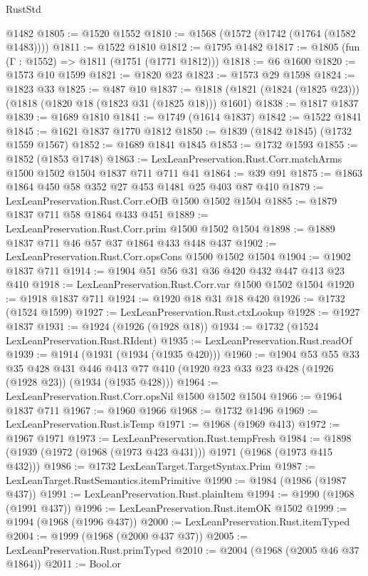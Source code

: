 \begin{lexlean}{RustStd}
\begin{coremodule}
    @1482
@1805 := @1520 @1552
@1810 := @1568 (@1572 (@1742 (@1764 (@1582 @1483))))
@1811 := @1522 @1810
@1812 := @1795 @1482
@1817 := @1805 (fun (Γ : @1552) => @1811 (@1751 (@1771 @1812)))
@1818 := @6 @1600
@1820 := @1573 @10 @1599
@1821 := @1820 @23
@1823 := @1573 @29 @1598
@1824 := @1823 @33
@1825 := @487 @10
@1837 := @1818 (@1821 (@1824 (@1825 @23))) (@1818 (@1820 @18 (@1823 @31 (@1825 @18))) @1601)
@1838 := @1817 @1837
@1839 := @1689 @1810
@1841 := @1749 (@1614 @1837)
@1842 := @1522 @1841
@1845 := @1621 @1837 @1770 @1812
@1850 := @1839 (@1842 @1845) (@1732 @1559 @1567)
@1852 := @1689 @1841 @1845
@1853 := @1732 @1593
@1855 := @1852 (@1853 @1748)
@1863 := LexLeanPreservation.Rust.Corr.matchArms @1500 @1502 @1504 @1837 @711 @711 @41
@1864 := @39 @91
@1875 := @1863 @1864 @450 @58 @352 @27 @453 @1481 @25 @403 @87 @410
@1879 := LexLeanPreservation.Rust.Corr.eOfB @1500 @1502 @1504
@1885 := @1879 @1837 @711 @58 @1864 @433 @451
@1889 := LexLeanPreservation.Rust.Corr.prim @1500 @1502 @1504
@1898 := @1889 @1837 @711 @46 @57 @37 @1864 @433 @448 @437
@1902 := LexLeanPreservation.Rust.Corr.opsCons @1500 @1502 @1504
@1904 := @1902 @1837 @711
@1914 := @1904 @51 @56 @31 @36 @420 @432 @447 @413 @23 @410
@1918 := LexLeanPreservation.Rust.Corr.var @1500 @1502 @1504
@1920 := @1918 @1837 @711
@1924 := @1920 @18 @31 @18 @420
@1926 := @1732 (@1524 @1599)
@1927 := LexLeanPreservation.Rust.ctxLookup
@1928 := @1927 @1837
@1931 := @1924 (@1926 (@1928 @18))
@1934 := @1732 (@1524 LexLeanPreservation.Rust.RIdent)
@1935 := LexLeanPreservation.Rust.readOf
@1939 := @1914 (@1931 (@1934 (@1935 @420)))
@1960 := @1904
    @53
    @55
    @33
    @35
    @428
    @431
    @446
    @413
    @77
    @410
    (@1920 @23 @33 @23 @428 (@1926 (@1928 @23)) (@1934 (@1935 @428)))
@1964 := LexLeanPreservation.Rust.Corr.opsNil @1500 @1502 @1504
@1966 := @1964 @1837 @711
@1967 := @1960 @1966
@1968 := @1732 @1496
@1969 := LexLeanPreservation.Rust.isTemp
@1971 := @1968 (@1969 @413)
@1972 := @1967 @1971
@1973 := LexLeanPreservation.Rust.tempFresh
@1984 := @1898 (@1939 (@1972 (@1968 (@1973 @423 @431))) @1971 (@1968 (@1973 @415 @432)))
@1986 := @1732 LexLeanTarget.TargetSyntax.Prim
@1987 := LexLeanTarget.RustSemantics.itemPrimitive
@1990 := @1984 (@1986 (@1987 @437))
@1991 := LexLeanPreservation.Rust.plainItem
@1994 := @1990 (@1968 (@1991 @437))
@1996 := LexLeanPreservation.Rust.itemOK @1502
@1999 := @1994 (@1968 (@1996 @437))
@2000 := LexLeanPreservation.Rust.itemTyped
@2004 := @1999 (@1968 (@2000 @437 @37))
@2005 := LexLeanPreservation.Rust.primTyped
@2010 := @2004 (@1968 (@2005 @46 @37 @1864))
@2011 := Bool.or

\end{coremodule}
\end{lexlean}

